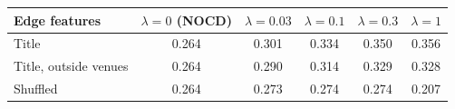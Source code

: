 \begin{tabular}{lccccc}
\toprule
Edge features & $\lambda = 0$ (NOCD) & $\lambda = 0.03$ & $\lambda = 0.1$ & $\lambda = 0.3$ & $\lambda = 1$ \\
\midrule
Title & 0.264 & 0.301 & 0.334 & 0.350 & 0.356 \\
Title, outside venues & 0.264 & 0.290 & 0.314 & 0.329 & 0.328 \\
Shuffled & 0.264 & 0.273 & 0.274 & 0.274 & 0.207 \\
\bottomrule
\end{tabular}
